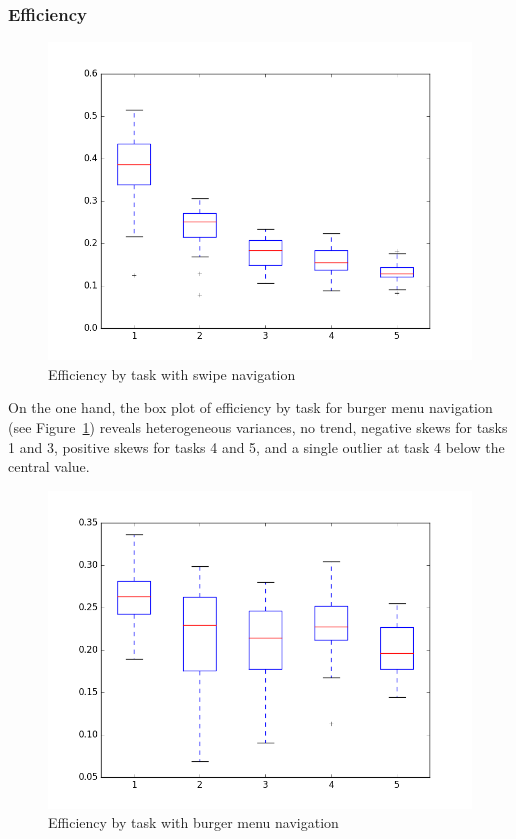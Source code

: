 \documentclass{sig-alternate-05-2015}
\begin{document}
\subsubsection{Efficiency}

\begin{figure}[h]
  \centering
  \includegraphics[width=\columnwidth]{pics/swipe_boxplot.png}
  \caption{Efficiency by task with swipe navigation}\label{fig:swipebox}
\end{figure}


On the one hand, the box plot of efficiency by task for burger menu navigation
(see Figure~\ref{fig:swipebox}) reveals heterogeneous variances,
no trend, negative skews for tasks 1 and 3, positive skews for tasks 4 and 5,
and a single outlier at task 4 below the central value.

\begin{figure}[h]
  \centering
  \includegraphics[width=\columnwidth]{pics/burger_boxplot.png}
  \caption{Efficiency by task with burger menu navigation}\label{fig:burgerbox}
\end{figure}
\end{document}
